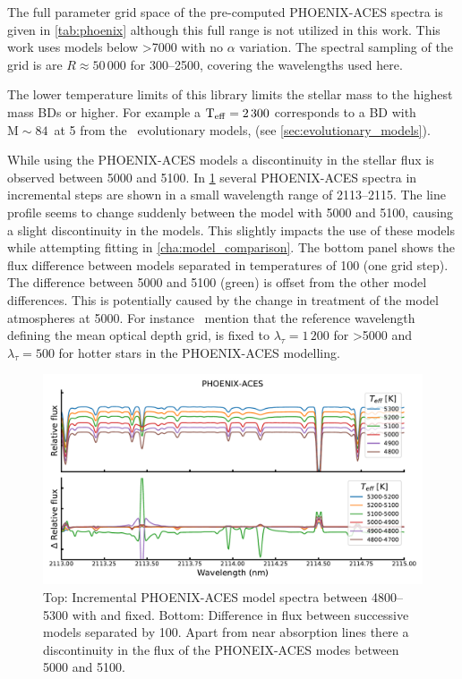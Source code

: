 The full parameter grid space of the pre-computed {PHOENIX-ACES} spectra is given in \cref{tab:phoenix} although this full range is not utilized in this work.
This work uses models below >7000\K{} with no $\alpha$ variation.
The spectral sampling of the grid is are $R \approx 50\,000$ for 300--2500\nm, covering the wavelengths used here.



The lower temperature limits of this library limits the stellar mass to the highest mass BDs or higher.
For example a \(\textrm{T}_{\mathrm{eff}}{}=2\,300\)\K{} corresponds to a {BD} with \(\textrm{M}\sim84\)\,\Mjup{} at 5\Gyr{} from the~\citet{baraffe_evolutionary_2003} evolutionary models, (see \cref{sec:evolutionary_models}).


While using the {PHOENIX-ACES} models a discontinuity in the stellar flux is observed between 5000\K{} and 5100\K.
In \cref{fig:phoenixdiffereceat5000k} several {PHOENIX-ACES} spectra in incremental steps are shown in a small wavelength range of 2113--2115\nm{}.
The line profile seems to change suddenly between the model with 5000\K{} and 5100\K, causing a slight discontinuity in the models.
This slightly impacts the use of these models while attempting \textchisquared{} fitting in \cref{cha:model_comparison}.
The bottom panel shows the flux difference between models separated in temperatures of 100\K{} (one grid step).
The difference between 5000 and 5100\K{} (green) is offset from the other model differences.
This is potentially caused by the change in treatment of the model atmospheres at 5000\K.
For instance~\citet{husser_new_2013} mention that the reference wavelength defining the mean optical depth grid, is fixed to $\lambda_{\tau}=1\,200$\nm{} for \txteff{}>5000\K{} and $\lambda_{\tau}=500$\nm{} for hotter stars in the {PHOENIX-ACES} modelling.
\begin{figure}
    \centering
    \includegraphics[width=0.7\linewidth]{figures/atmos_and_models/phoenix_differece_at_5000K}
    \caption{Top: Incremental {PHOENIX-ACES} model spectra between 4800--5300\K{} with  and  fixed.
    Bottom: Difference in flux between successive models separated by 100\K.
    Apart from near absorption lines there a discontinuity in the flux of the PHONEIX-ACES modes between 5000 and 5100\K.}
    \label{fig:phoenixdiffereceat5000k}
\end{figure}


